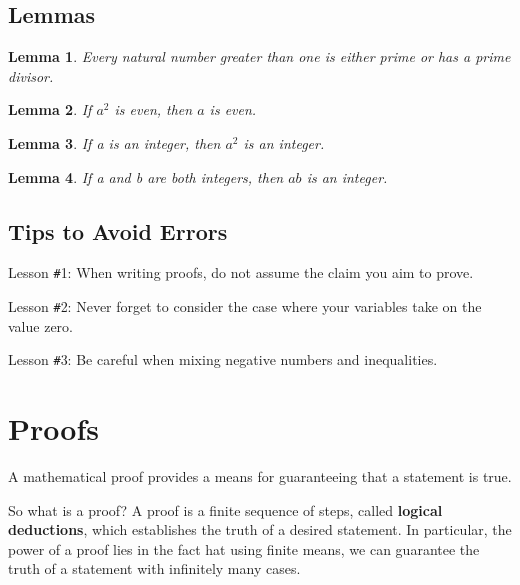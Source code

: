 \documentclass[12pt,a4paper]{article}
\newtheorem{lemma}{Lemma}[section]
\theoremstyle{definition}
\begin{document}
\subsection*{Lemmas}

\begin{lemma}
Every natural number greater than one is either prime or has a prime divisor.
\end{lemma}

\begin{lemma}
If $a^2$ is even, then $a$ is even.
\end{lemma}

\begin{lemma}
If a is an integer, then $a^2$ is an integer.
\end{lemma}

\begin{lemma}
If a and b are both integers, then $ab$ is an integer.
\end{lemma}

\subsection*{Tips to Avoid Errors}

Lesson \texttt{\#}1: When writing proofs, do not assume the claim you aim to prove.

\bigbreak

Lesson \texttt{\#}2: Never forget to consider the case where your variables take on the value zero.

\bigbreak

Lesson \texttt{\#}3: Be careful when mixing negative numbers and inequalities.

\setcounter{theorem}{0}
\setcounter{lemma}{0}

\newpage

\section*{Proofs}

A mathematical proof provides a means for guaranteeing that a statement is true. 

\bigbreak

So what is a proof? A proof is a finite sequence of steps, called \textbf{logical deductions}, which establishes the truth of a desired statement. In particular, the power of a proof lies in the fact hat using finite means, we can guarantee the truth of a statement with infinitely many cases.
\end{document}
